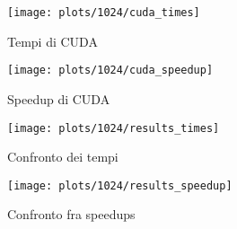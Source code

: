 \begin{figure}[H]
    \centering
    \begin{minipage}{0.49\textwidth}
        \centering
        \texttt{[image: plots/1024/cuda\_times]}
        \caption{Tempi di CUDA}\label{fig:times-1024-cuda}
    \end{minipage}
    \begin{minipage}{0.49\textwidth}
        \centering
        \texttt{[image: plots/1024/cuda\_speedup]}
        \caption{Speedup di CUDA}\label{fig:speedup-1024-cuda}
    \end{minipage}
\end{figure}

\begin{figure}[H]
    \centering
    \begin{minipage}{0.49\textwidth}
        \centering
        \texttt{[image: plots/1024/results\_times]}
        \caption{Confronto dei tempi}\label{fig:tempi-1024}
    \end{minipage}
    \begin{minipage}{0.49\textwidth}
        \centering
        \texttt{[image: plots/1024/results\_speedup]}
        \caption{Confronto fra speedups}\label{fig:speedups-1024}
    \end{minipage}
\end{figure}